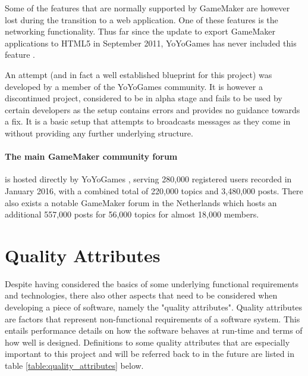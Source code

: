 \documentclass[bsc,frontabs,twoside,singlespacing,parskip,deptreport]{infthesis}     %
\begin{document}
Some of the features that are normally supported by GameMaker are however lost during the transition to a web application. One of these features is the networking functionality. Thus far since the update to export GameMaker applications to HTML5 in September 2011, YoYoGames has never included this feature \cite{gamemaker_missing_networking}.

An attempt (and in fact a well established blueprint for this project) was developed by a member of the YoYoGames community. It is however a discontinued project, considered to be in alpha stage and fails to be used by certain developers \cite{gamemaker_networking_attempt} as the setup contains errors and provides no guidance towards a fix. It is a basic setup that attempts to broadcasts messages as they come in without providing any further underlying structure.

\paragraph*{The main GameMaker community forum} is hosted directly by YoYoGames \cite{yoyogames_forum}, serving 280,000 registered users recorded in January 2016, with a combined total of 220,000 topics and 3,480,000 posts. There also exists a notable GameMaker forum in the Netherlands \cite{dutch_gamemaker_forum} which hosts an additional 557,000 posts for 56,000 topics for almost 18,000 members.

\section{Quality Attributes}
Despite having considered the basics of some underlying functional requirements and technologies, there also other aspects that need to be considered when developing a piece of software, namely the "quality attributes". Quality attributes are factors that represent non-functional requirements of a software system. This entails performance details on how the software behaves at run-time and terms of how well is designed. Definitions to some quality attributes that are especially important to this project and will be referred back to in the future are listed in table \ref{table:quality_attributes} below.
 
\end{document}
